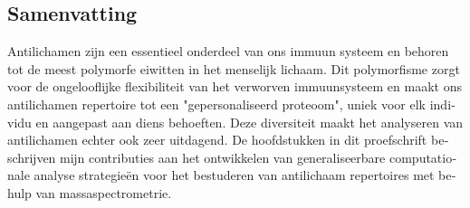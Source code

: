\begin{otherlanguage}{dutch}
  \clearpage


  \section{Samenvatting}
  Antilichamen zijn een essentieel onderdeel van ons immuun systeem en behoren tot de meest polymorfe eiwitten in het menselijk lichaam. Dit polymorfisme zorgt voor de ongelooflijke flexibiliteit van het verworven immuunsysteem en maakt ons antilichamen repertoire tot een "gepersonaliseerd proteoom", uniek voor elk individu en aangepast aan diens behoeften. Deze diversiteit maakt het analyseren van antilichamen echter ook zeer uitdagend. De hoofdstukken in dit proefschrift beschrijven mijn contributies aan het ontwikkelen van generaliseerbare computationale analyse strategieën voor het bestuderen van antilichaam repertoires met behulp van massaspectrometrie.
  \bigskip\\

\end{otherlanguage}

